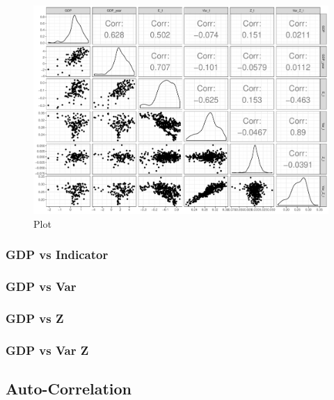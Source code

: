 \documentclass[12pt,a4paper,oneside]{book}
\begin{document}
\begin{figure}[H]
    \centering
    \includegraphics[scale=0.5]{Graphs/ggpairs2.pdf}
    \caption{Plot }
    \label{ggpairs2}
\end{figure}

\subsubsection{GDP vs Indicator}

\subsubsection{GDP vs Var}

\subsubsection{GDP vs Z}

\subsubsection{GDP vs Var Z}


\newpage

\subsection{Auto-Correlation}
\end{document}
